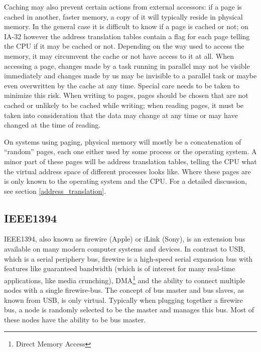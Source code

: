 Caching may also prevent certain actions from external accessors: if a page is
cached in another, faster memory, a copy of it will typically reside in physical
memory.  In the general case it is difficult to know if a page is cached or not;
on IA-32 however the address translation tables contain a flag for each page
telling the CPU if it may be cached or not.  Depending on the way used to access
the memory, it may circumvent the cache or not have access to it at all.  When
accessing a page, changes made by a task running in parallel may not be visible
immediately and changes made by us may be invisible to a parallel task or maybe
even overwritten by the cache at any time.  Special care needs to be taken to
minimize this risk.  When writing to pages, pages should be chosen that are not
cached or unlikely to be cached while writing; when reading pages, it must be
taken into consideration that the data may change at any time or may have
changed at the time of reading.

On systems using paging, physical memory will mostly be a concatenation of
``random'' pages, each one either used by some process or the operating system.
A minor part of these pages will be address translation tables, telling the CPU
what the virtual address space of different processes looks like. Where these
pages are is only known to the operating system and the CPU.  For a detailed
discussion, see section \ref{address_translation}.



\subsection{IEEE1394}

\label{phys1394}
IEEE1394, also known as \epsfysize 0.3cm 
firewire (Apple) or iLink (Sony), is an extension bus available on many modern
computer systems and devices.  In contrast to USB, which is a serial periphery
bus, firewire is a high-speed serial expansion bus with features like guaranteed
bandwidth (which is of interest for many real-time applications, like media
crunching), DMA\footnote{Direct Memory Access} and the ability to connect
multiple nodes with a single firewire-bus.  The concept of bus master and bus
slaves, as known from USB, is only virtual.  Typically when plugging together a
firewire bus, a node is randomly selected to be the master and manages this bus.
Most of these nodes have the ability to be bus master.

